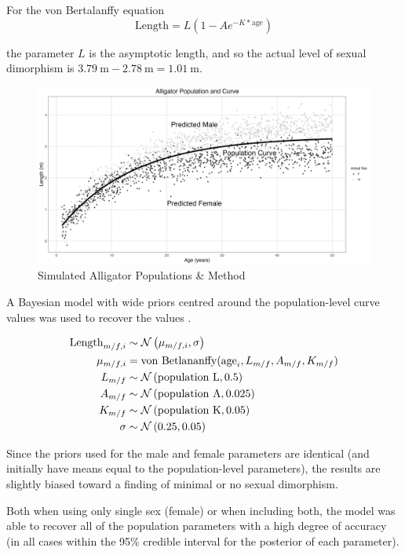 \documentclass[letterpaper]{article}
\begin{document}
For the von Bertalanffy equation
$$
\text{Length} = L(1 - Ae^{-K \ast \text{age}})
$$

the parameter $L$ is the asymptotic length, and so the actual level of sexual dimorphism is $\SI{3.79}{\m} - \SI{2.78}{\m} = \SI{1.01}{\m}$.

\begin{figure}
	\centering
	\includegraphics[width = \textwidth]{images/alligatorMethod.png}
	\caption{Simulated Alligator Populations \& Method}
	\label{fig:alligatorSim}
\end{figure}

 A Bayesian model with wide priors centred around the population-level curve values was used to recover the values \parencite{rCore, rstan}.

\begin{align*}
\text{Length}_{m/f,i} &\sim \mathcal{N}\left(\mu_{m/f, i}, \sigma\right) \\
\mu_{m/f, i} &= \text{von Betlananffy}(\text{age}_i, L_{ m/f }, A_{ m/f }, K_{ m/f }) \\
L_{ m/f } &\sim \mathcal{N}\left(\text{population L}, 0.5\right) \\
A_{ m/f } &\sim \mathcal{N}\left(\text{population A}, 0.025\right) \\
K_{ m/f } &\sim \mathcal{N}\left(\text{population K}, 0.05\right) \\
\sigma &\sim \mathcal{N}\left(0.25, 0.05\right) \\
\end{align*}

Since the priors used for the male and female parameters are identical (and initially have means equal to the population-level parameters), the results are slightly biased toward a finding of minimal or no sexual dimorphism.

Both when using only single sex (female) or when including both, the model was able to recover all of the population parameters with a high degree of accuracy (in all cases within the 95\% credible interval for the posterior of each parameter).
\end{document}
